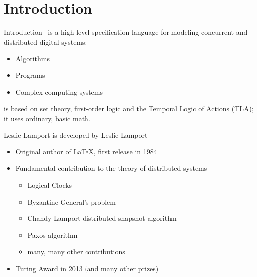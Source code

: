 \section[image=bgphoto_cut]{\tlap Introduction}
\begin{frame}[plain]{}
    \sectionpage
\end{frame}

\begin{frame}{Introduction}
    \tlap\ is a high-level specification language for modeling concurrent and distributed digital systems:
    \begin{itemize}
        \item Algorithms
        \item Programs
        \item Complex computing systems
    \end{itemize}

    \tlap is based on set theory, first-order logic and the Temporal Logic of Actions (TLA); it uses ordinary, basic math.
\end{frame}

\begin{frame}{Leslie Lamport}
    \tlap is developed by Leslie Lamport
    \begin{itemize}
        \item Original author of \LaTeX, first release in 1984
        \item Fundamental contribution to the theory of distributed systems
        \begin{itemize}
            \item Logical Clocks
            \item Byzantine General's problem
            \item Chandy-Lamport distributed snapshot algorithm
            \item Paxos algorithm
            \item many, many other contributions
        \end{itemize}
        \item Turing Award in 2013 (and many other prizes)
    \end{itemize}
\end{frame}

